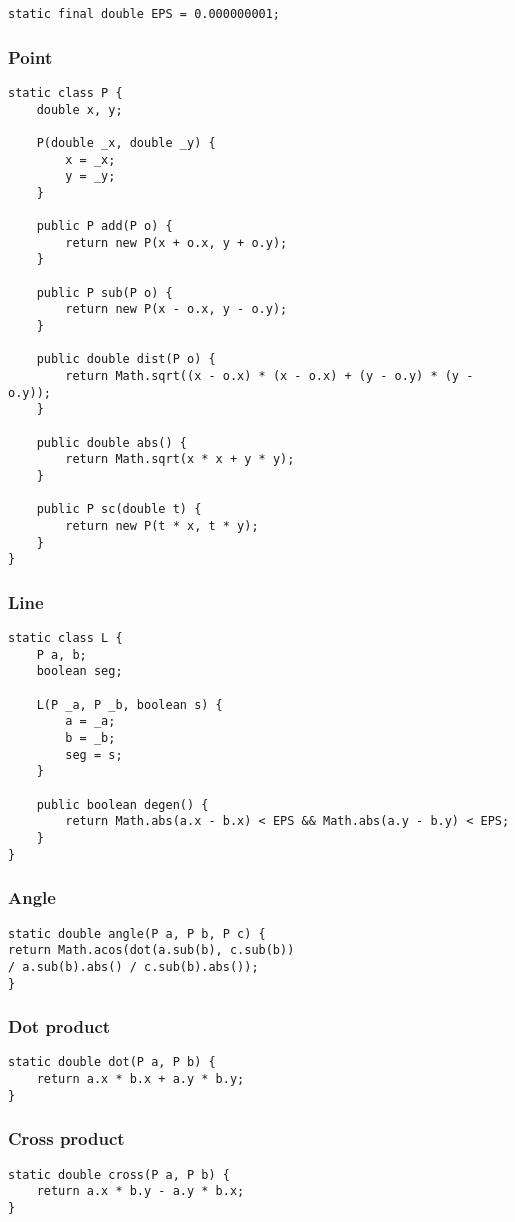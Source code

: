 \begin{verbatim}
static final double EPS = 0.000000001;
\end{verbatim}
\subsubsection{Point}
\begin{verbatim}
static class P {
	double x, y;
	
	P(double _x, double _y) {
		x = _x;
		y = _y;
	}
	
	public P add(P o) {
		return new P(x + o.x, y + o.y);
	}
	
	public P sub(P o) {
		return new P(x - o.x, y - o.y);
	}
	
	public double dist(P o) {
		return Math.sqrt((x - o.x) * (x - o.x) + (y - o.y) * (y - o.y));
	}
	
	public double abs() {
		return Math.sqrt(x * x + y * y);
	}
	
	public P sc(double t) {
		return new P(t * x, t * y);
	}
}
\end{verbatim}
\subsubsection{Line}
\begin{verbatim}
static class L {
	P a, b;
	boolean seg;
	
	L(P _a, P _b, boolean s) {
		a = _a;
		b = _b;
		seg = s;
	}
	
	public boolean degen() {
		return Math.abs(a.x - b.x) < EPS && Math.abs(a.y - b.y) < EPS;
	}
}
\end{verbatim}
\subsubsection{Angle}
\begin{verbatim}
static double angle(P a, P b, P c) {
return Math.acos(dot(a.sub(b), c.sub(b))
/ a.sub(b).abs() / c.sub(b).abs());
}
\end{verbatim}
\subsubsection{Dot product}
\begin{verbatim}
static double dot(P a, P b) {
	return a.x * b.x + a.y * b.y;
}
\end{verbatim}
\subsubsection{Cross product}
\begin{verbatim}
static double cross(P a, P b) {
	return a.x * b.y - a.y * b.x;
}
\end{verbatim}
